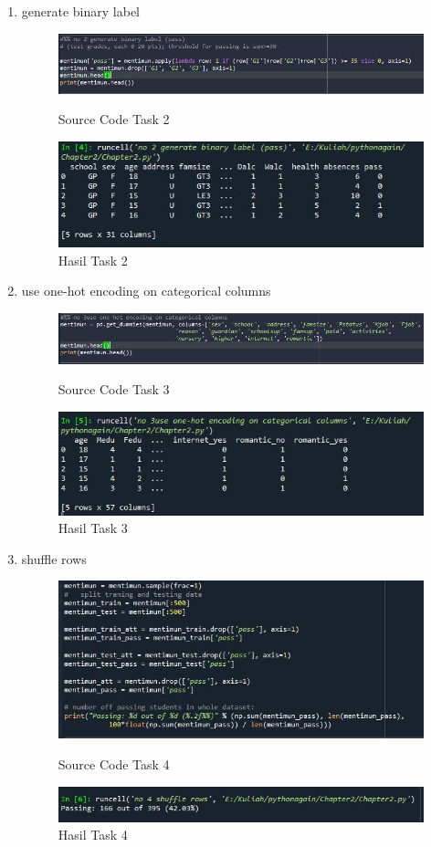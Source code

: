 \begin{enumerate}
\newpage
\item generate binary label
\begin{figure}[!htbp]
    \centering
    \includegraphics[scale=0.4]{figures/Chap2-2.JPG}
	\caption{Source Code Task 2}
    \includegraphics[scale=0.5]{figures/Chap2-2.1.JPG}
	\caption{Hasil Task 2}
\end{figure}

\item use one-hot encoding on categorical columns
\begin{figure}[!htbp]
    \centering
    \includegraphics[scale=0.4]{figures/Chap3-1.JPG}
	\caption{Source Code Task 3}
    \includegraphics[scale=0.5]{figures/Chap3-1.1.JPG}
	\caption{Hasil Task 3}
\end{figure}

\item shuffle rows
\begin{figure}[!htbp]
    \centering
    \includegraphics[scale=0.4]{figures/Chap4-1.JPG}
	\caption{Source Code Task 4}
	\newpage
    \includegraphics[scale=0.5]{figures/Chap4-1.1.JPG}
	\caption{Hasil Task 4}
\end{figure}


\end{enumerate}
